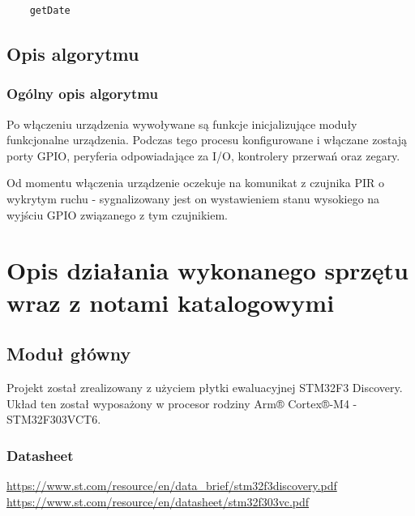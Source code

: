 \documentclass{article}
\begin{document}
\begin{lstlisting}
    getDate
\end{lstlisting}


\subsection{Opis algorytmu}

\subsubsection{Ogólny opis algorytmu}
Po włączeniu urządzenia wywoływane są funkcje inicjalizujące moduły funkcjonalne
urządzenia. Podczas tego procesu konfigurowane i włączane zostają porty GPIO,
peryferia odpowiadające za I/O, kontrolery przerwań oraz zegary.

Od momentu włączenia urządzenie oczekuje na komunikat z czujnika PIR o wykrytym ruchu - sygnalizowany
jest on wystawieniem stanu wysokiego na wyjściu GPIO związanego z tym czujnikiem.


\section{Opis działania wykonanego sprzętu wraz z notami katalogowymi}

\subsection{Moduł główny}
Projekt został zrealizowany z użyciem płytki ewaluacyjnej STM32F3 Discovery.
Układ ten został wyposażony w procesor rodziny Arm® Cortex®-M4 - STM32F303VCT6.

\subsubsection{Datasheet}
\url{https://www.st.com/resource/en/data_brief/stm32f3discovery.pdf}
\newline
\url{https://www.st.com/resource/en/datasheet/stm32f303vc.pdf}
\end{document}
